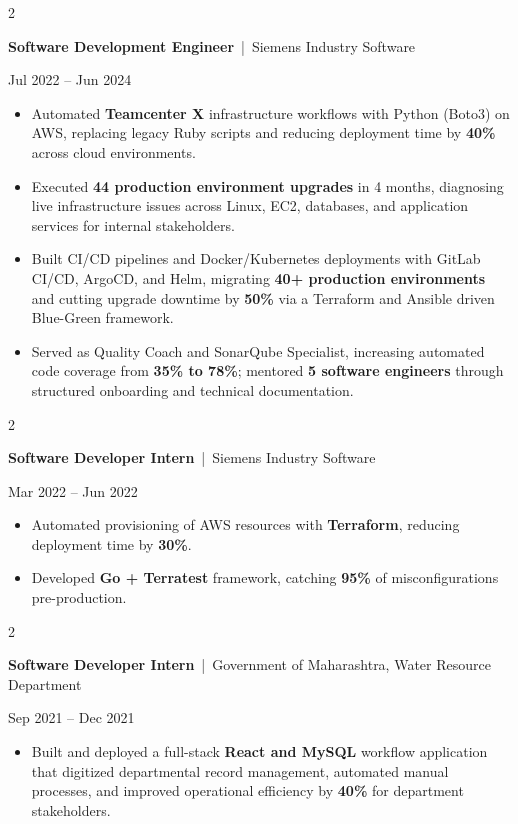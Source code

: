 \documentclass[10pt, letterpaper]{article}
\newenvironment{highlights}{
    \begin{itemize}[
        topsep=0.10 cm,
        parsep=0.06 cm,
        partopsep=0pt,
        itemsep=0.06 cm,
        leftmargin=12pt
    ]
}{
    \end{itemize}
}
\newenvironment{twocolentry}[2][]{
    \onecolentry
    \def\secondColumn{#2}
    \setcolumnwidth{\fill, 4.5 cm}
    \begin{paracol}{2}
}{
    \switchcolumn \raggedleft \secondColumn
    \end{paracol}
    \endonecolentry
}
\begin{document}
\vspace{0.15 cm}

\begin{twocolentry}{Jul 2022 -- Jun 2024}
\textbf{Software Development Engineer} \,|\, Siemens Industry Software
\end{twocolentry}
\begin{highlights}
  \item Automated \textbf{Teamcenter X} infrastructure workflows with Python (Boto3) on AWS, replacing legacy Ruby scripts and reducing deployment time by \textbf{40\%} across cloud environments.
  \item Executed \textbf{44 production environment upgrades} in 4 months, diagnosing live infrastructure issues across Linux, EC2, databases, and application services for internal stakeholders.
  \item Built CI/CD pipelines and Docker/Kubernetes deployments with GitLab CI/CD, ArgoCD, and Helm, migrating \textbf{40+ production environments} and cutting upgrade downtime by \textbf{50\%} via a Terraform and Ansible driven Blue-Green framework.
  \item Served as Quality Coach and SonarQube Specialist, increasing automated code coverage from \textbf{35\% to 78\%}; mentored \textbf{5 software engineers} through structured onboarding and technical documentation.
\end{highlights}

\vspace{0.15 cm}

\begin{twocolentry}{Mar 2022 -- Jun 2022}
\textbf{Software Developer Intern} \,|\, Siemens Industry Software
\end{twocolentry}
\begin{highlights}
  \item Automated provisioning of AWS resources with \textbf{Terraform}, reducing deployment time by \textbf{30\%}.
  \item Developed \textbf{Go + Terratest} framework, catching \textbf{95\%} of misconfigurations pre-production.
\end{highlights}

\vspace{0.15 cm}

\begin{twocolentry}{Sep 2021 -- Dec 2021}
\textbf{Software Developer Intern} \,|\, Government of Maharashtra, Water Resource Department
\end{twocolentry}
\begin{highlights}
  \item Built and deployed a full-stack \textbf{React and MySQL} workflow application that digitized departmental record management, automated manual processes, and improved operational efficiency by \textbf{40\%} for department stakeholders.
\end{highlights}
\end{document}
